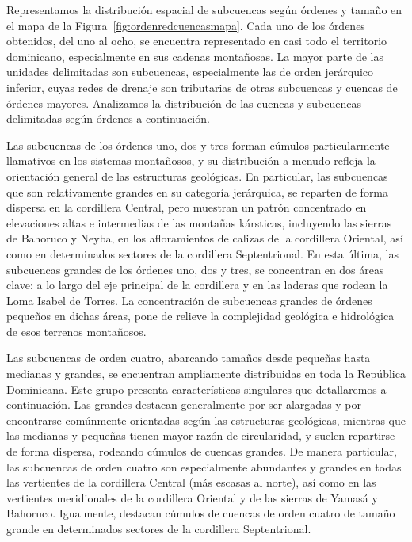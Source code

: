 \documentclass[spanish]{article}
\begin{document}
Representamos la distribución espacial de subcuencas según órdenes y
tamaño en el mapa de la Figura~\ref{fig:ordenredcuencasmapa}. Cada uno
de los órdenes obtenidos, del uno al ocho, se encuentra representado en
casi todo el territorio dominicano, especialmente en sus cadenas
montañosas. La mayor parte de las unidades delimitadas son subcuencas,
especialmente las de orden jerárquico inferior, cuyas redes de drenaje
son tributarias de otras subcuencas y cuencas de órdenes mayores.
Analizamos la distribución de las cuencas y subcuencas delimitadas según
órdenes a continuación.

Las subcuencas de los órdenes uno, dos y tres forman cúmulos
particularmente llamativos en los sistemas montañosos, y su distribución
a menudo refleja la orientación general de las estructuras geológicas.
En particular, las subcuencas que son relativamente grandes en su
categoría jerárquica, se reparten de forma dispersa en la cordillera
Central, pero muestran un patrón concentrado en elevaciones altas e
intermedias de las montañas kársticas, incluyendo las sierras de
Bahoruco y Neyba, en los afloramientos de calizas de la cordillera
Oriental, así como en determinados sectores de la cordillera
Septentrional. En esta última, las subcuencas grandes de los órdenes
uno, dos y tres, se concentran en dos áreas clave: a lo largo del eje
principal de la cordillera y en las laderas que rodean la Loma Isabel de
Torres. La concentración de subcuencas grandes de órdenes pequeños en
dichas áreas, pone de relieve la complejidad geológica e hidrológica de
esos terrenos montañosos.

Las subcuencas de orden cuatro, abarcando tamaños desde pequeñas hasta
medianas y grandes, se encuentran ampliamente distribuidas en toda la
República Dominicana. Este grupo presenta características singulares que
detallaremos a continuación. Las grandes destacan generalmente por ser
alargadas y por encontrarse comúnmente orientadas según las estructuras
geológicas, mientras que las medianas y pequeñas tienen mayor razón de
circularidad, y suelen repartirse de forma dispersa, rodeando cúmulos de
cuencas grandes. De manera particular, las subcuencas de orden cuatro
son especialmente abundantes y grandes en todas las vertientes de la
cordillera Central (más escasas al norte), así como en las vertientes
meridionales de la cordillera Oriental y de las sierras de Yamasá y
Bahoruco. Igualmente, destacan cúmulos de cuencas de orden cuatro de
tamaño grande en determinados sectores de la cordillera Septentrional.
\end{document}
